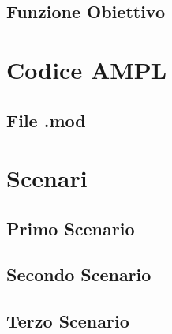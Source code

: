 \documentclass[10pt, a4paper]{article}
\begin{document}
\subsection{Funzione Obiettivo}
\newpage
\section{Codice AMPL}
\subsection{File .mod}
\newpage
\section{Scenari}
\subsection{Primo Scenario}
\subsection{Secondo Scenario}
\subsection{Terzo Scenario}
\end{document}
